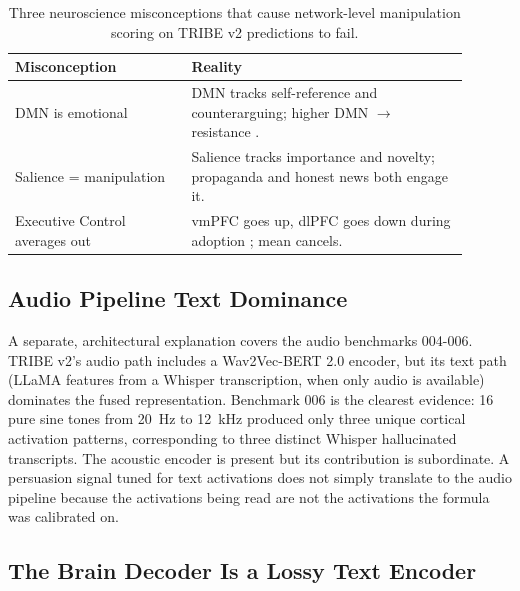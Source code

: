 \documentclass[11pt]{article}
\begin{document}
\begin{table}[t]
    \centering
    \small
    \begin{tabular}{@{}p{0.35\linewidth}p{0.55\linewidth}@{}}
        \toprule
        Misconception & Reality \\
        \midrule
        DMN is emotional & DMN tracks self-reference and counterarguing; higher DMN $\to$ resistance \cite{ntoumanis2024deciphering}. \\
        Salience = manipulation & Salience tracks importance and novelty; propaganda and honest news both engage it. \\
        Executive Control averages out & vmPFC goes up, dlPFC goes down during adoption \cite{falk2010predicting}; mean cancels. \\
        \bottomrule
    \end{tabular}
    \caption{Three neuroscience misconceptions that cause network-level manipulation scoring on TRIBE v2 predictions to fail.}
    \label{tab:misconceptions}
\end{table}

\subsection{Audio Pipeline Text Dominance}

A separate, architectural explanation covers the audio benchmarks 004-006. TRIBE v2's audio path includes a Wav2Vec-BERT 2.0 encoder, but its text path (LLaMA features from a Whisper transcription, when only audio is available) dominates the fused representation. Benchmark 006 is the clearest evidence: 16 pure sine tones from 20~Hz to 12~kHz produced only three unique cortical activation patterns, corresponding to three distinct Whisper hallucinated transcripts. The acoustic encoder is present but its contribution is subordinate. A persuasion signal tuned for text activations does not simply translate to the audio pipeline because the activations being read are not the activations the formula was calibrated on.

\subsection{The Brain Decoder Is a Lossy Text Encoder}
\end{document}
